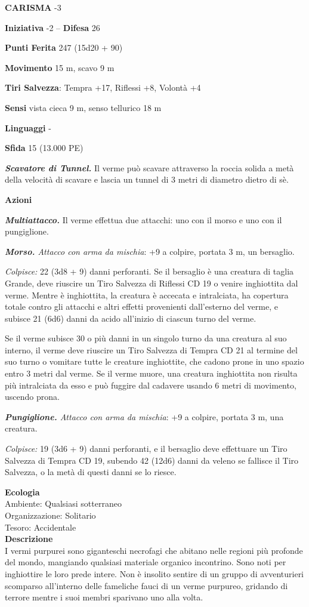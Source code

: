 \begin{multicols}{2}
\textbf{CARISMA} -3

\textbf{Iniziativa} -2 -- \textbf{Difesa} 26

\textbf{Punti Ferita} 247 (15d20 + 90)

\textbf{Movimento} 15 m, scavo 9 m

\textbf{Tiri Salvezza}: Tempra +17, Riflessi +8, Volontà +4

\textbf{Sensi} vista cieca 9 m, senso tellurico 18 m

\textbf{Linguaggi} -

\textbf{Sfida} 15 (13.000 PE)

\emph{\textbf{Scavatore di Tunnel.}} Il verme può scavare attraverso la roccia solida a metà della velocità di scavare e lascia un tunnel di 3 metri di diametro dietro di sè.

\textbf{Azioni}

\emph{\textbf{Multiattacco.}} Il verme effettua due attacchi: uno con il morso e uno con il pungiglione.

\emph{\textbf{Morso.} Attacco con arma da mischia}: +9 a colpire,
portata 3 m, un bersaglio.

\emph{Colpisce:} 22 (3d8 + 9) danni perforanti. Se il bersaglio è una creatura di taglia Grande, deve riuscire un Tiro Salvezza di Riflessi CD 19 o venire inghiottita dal verme. Mentre è inghiottita, la creatura è accecata e intralciata, ha copertura totale contro gli attacchi e altri effetti provenienti dall'esterno del verme, e subisce 21 (6d6) danni da acido all'inizio di ciascun turno del verme.

Se il verme subisce 30 o più danni in un singolo turno da una creatura al suo interno, il verme deve riuscire un Tiro Salvezza di Tempra CD 21 al termine del suo turno o vomitare tutte le creature inghiottite, che cadono prone in uno spazio entro 3 metri dal verme. Se il verme muore, una creatura inghiottita non risulta più intralciata da esso e può fuggire dal cadavere usando 6 metri di movimento, uscendo prona.

\emph{\textbf{Pungiglione.} Attacco con arma da mischia}: +9 a colpire, portata 3 m, una creatura.

\emph{Colpisce:} 19 (3d6 + 9) danni perforanti, e il bersaglio deve effettuare un Tiro Salvezza di Tempra CD 19, subendo 42 (12d6) danni da veleno se fallisce il Tiro Salvezza, o la metà di questi danni se lo riesce.

\textbf{Ecologia}\\
Ambiente: Qualsiasi sotterraneo\\
Organizzazione: Solitario\\
Tesoro: Accidentale\\
\textbf{Descrizione}\\
I vermi purpurei sono giganteschi necrofagi che abitano nelle regioni più profonde del mondo, mangiando qualsiasi materiale organico incontrino. Sono noti per inghiottire le loro prede intere. Non è insolito sentire di un gruppo di avventurieri scomparso all'interno delle fameliche fauci di un verme purpureo, gridando di terrore mentre i suoi membri sparivano uno alla volta.\\


\end{multicols}
